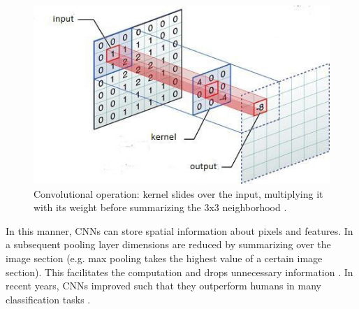 \documentclass[12pt,letterpaper]{article}
\begin{document}
\begin{figure}
	\centering
	\includegraphics[width=.48\textwidth]{cnn.png}
	\caption{Convolutional operation: kernel slides over the input, multiplying it with its weight before summarizing the 3x3 neighborhood \citep{Escontrela.2018}.}
	\label{convolut}
\end{figure}
In this manner, CNNs can store spatial information about pixels and features. In a subsequent pooling layer dimensions are reduced by summarizing over the image section (e.g. max pooling takes the highest value of a certain image section). This facilitates the computation and drops unnecessary information \citep{Lecture.2019}. In recent years, CNNs improved such that they outperform humans in many classification tasks \citep{Russakovsky.2014}.
\newpage
\end{document}
